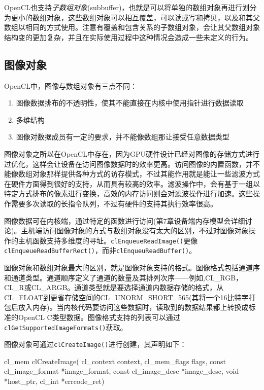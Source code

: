 OpenCL也支持\emph{子数组对象}(subbuffer)，也就是可以将单独的数组对象再进行划分为更小的数组对象，这些数组对象可以相互覆盖，可以读或写和拷贝，以及和其父数组以相同的方式使用。注意有覆盖和包含关系的子数组对象，会让其父数组对象结构变的更加复杂，并且在实际使用过程中这种情况会造成一些未定义的行为。

\subsection{图像对象}

OpenCL中，图像与数组对象有三点不同：

\begin{enumerate}
\item 图像数据排布的不透明性，使其不能直接在内核中使用指针进行数据读取
\item 多维结构
\item 图像对数据成员有一定的要求，并不能像数组那让接受任意数据类型
\end{enumerate}

图像对象之所以在OpenCL中存在，因为GPU硬件设计已经对图像的存储方式进行过优化，这样会让设备在访问图像数据时的效率更高。访问图像的内置函数，并不能像数组对象那样提供各种方式的访存模式，不过其能作用就是能让一些滤波方式在硬件方面得到很好的支持，从而具有较高的效率。滤波操作中，会有基于一组以特定方式排布的像素进行变换，高效的内存访问则会对滤波操作进行加速。这些操作需要多次读取的长指令队列，不过有硬件的支持其执行效率很高。

图像数据可在内核端，通过特定的函数进行访问(第7章设备端内存模型会详细讨论)。主机端访问图像对象的方式与数组对象没有太大的区别，不过对图像对象操作的主机函数支持多维度的寻址。\texttt{clEnqueueReadImage()}更像\texttt{clEnqueueReadBufferRect()}，而非\texttt{clEnqueuReadBuffer()}。

图像对象和数组对象最大的区别，就是图像对象支持的格式。图像格式包括通道序和通道类型。通道顺序定义了通道的数量及其排列次序——例如,CL\_\allowbreak{}RGB，CL\_\allowbreak{}R或CL\_\allowbreak{}ARGB。通道类型就是要选择通道内数据存储的格式，从CL\_\allowbreak{}FLOAT到更省存储空间的CL\_\allowbreak{}UNORM\_\allowbreak{}SHORT\_\allowbreak{}565(其将一个16比特字打包后放入内存)。当内核代码要访问这些数据时，读取到的数据结果都上转换成标准的OpenCL C类型数据。图像格式支持的列表可以通过\texttt{clGetSupportedImageFormats()}获取。

图像对象可通过\texttt{clCreateImage()}进行创建，其声明如下：

\begin{codebox}[cpp]
cl_mem
clCreateImage(
  cl_context context,
  cl_mem_flags flags,
  const cl_image_format *image_format,
  const cl_image_desc *image_desc,
  void *host_ptr,
  cl_int *errcode_ret)
\end{codebox}

